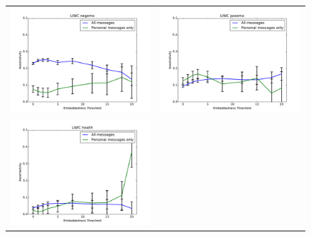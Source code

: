 \documentclass[11pt]{article}
\begin{document}
\begin{figure}
\begin{tabular}{cc}
\includegraphics[scale=.2]{negemo_corr.pdf} &
\includegraphics[scale=.2]{posemo_corr.pdf}\\
\includegraphics[scale=.2]{health_corr.pdf} &

\end{tabular}
\end{figure}
\end{document}
